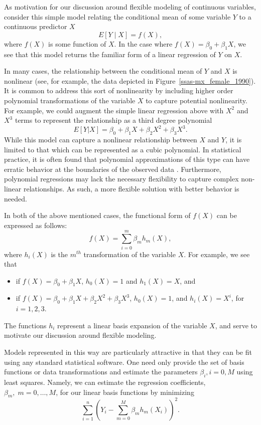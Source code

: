 As motivation for our discussion around flexible modeling of
continuous variables, consider this simple model relating the
conditional mean of some variable $Y$ to a continuous predictor
$X$ 
\[
E[Y \mid X] = f(X),
\]
where $f(X)$ is some function of $X$. In the case where $f(X) =
\beta_0 + \beta_1 X$, we see that this model returns the familiar form
of a linear regression of $Y$ on $X$.

In many cases, the relationship between the conditional mean of $Y$
and $X$ is nonlinear (see, for example, the data depicted in
Figure~\ref{ssas-mx_female_1990}). It is common to address this sort
of nonlinearity by including higher order polynomial transformations
of the variable $X$ to capture potential nonlinearity. For example, we
could augment the simple linear regression above with $X^2$ and $X^3$
terms to represent the relationship as a third degree
polynomial 
\[
E[Y|X] = \beta_0 + \beta_1 X + \beta_2 X^2 + \beta_3 X^3.
\]
While this model can capture a nonlinear relationship between $X$ and
$Y$, it is limited to that which can be represented as a cubic
polynomial.  In statistical practice, it is often found that
polynomial approximations of this type can have erratic behavior at
the boundaries of the observed data \cite{ESL}. Furthermore,
polynomial regressions may lack the necessary flexibility to capture
complex non-linear relationships. As such, a more flexible solution
with better behavior is needed.

In both of the above mentioned cases, the functional form of $f(X)$
can be expressed as follows:
\[
f(X) = \sum_{i=0}^m\beta_m h_m(X),
\]
where $h_i(X)$ is the $m^{th}$ transformation of the variable $X$. For
example, we see that \begin{itemize} \item if $f(X) = \beta_0 +
  \beta_1 X$, $h_0(X)=1$ and $h_1(X) = X$, and \item if $f(X) =
  \beta_0 + \beta_1 X + \beta_2 X^2 + \beta_3 X^3$, $h_0(X) = 1$, and
  $h_i(X) = X^i$, for $i=1,2,3$. \end{itemize} The functions $h_i$
represent a linear basis expansion of the variable $X$, and serve to
motivate our discussion around flexible modeling.

Models represented in this way are particularly attractive in that
they can be fit using any standard statistical software. One need only
provide the set of basis functions or data transformations and
estimate the parameters $\beta_i, i=0, M$ using least squares. Namely,
we can estimate the regression coefficients, $\beta_m,\; m=0, \dots,
M$, for our linear basis functions by minimizing 
\[
\sum_{i=1}^n\left(Y_i - \sum_{m=0}^M \beta_mh_m(X_i)\right)^2.
\]

